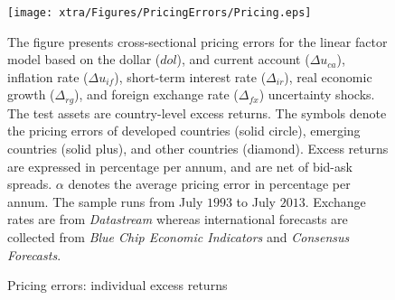\begin{landscape}
	\begin{figure}
		\begin{center}
			\texttt{[image: xtra/Figures/PricingErrors/Pricing.eps]}
		\end{center}
		\vspace{4cm}
		
		\caption{Pricing errors: individual excess returns} \label{fig:pricing_errors} \smallskip
		\begin{footnotesize}
			The figure presents cross-sectional pricing errors for the linear factor model based on the dollar ($dol$), and current account ($\Delta u_{ca}$), inflation rate ($\Delta u_{if}$), short-term interest rate ($\Delta_{ir}$), real economic growth ($\Delta_{rg}$), and foreign exchange rate ($\Delta_{fx}$) uncertainty shocks. The test assets are country-level excess returns. The symbols denote the pricing errors of developed countries (solid circle), emerging countries (solid plus), and other countries (diamond). Excess returns are expressed in percentage per annum, and are net of bid-ask spreads. $\alpha$ denotes the average pricing error in percentage per annum. The sample runs from July $1993$ to July $2013$. Exchange rates are from \textit{Datastream} whereas international forecasts are collected from \textit{Blue Chip Economic Indicators} and \textit{Consensus Forecasts}.
		\end{footnotesize}
		
	\end{figure}
\end{landscape}

